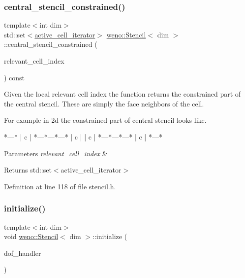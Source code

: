 \subsubsection{\texorpdfstring{central\+\_\+stencil\+\_\+constrained()}{central\_stencil\_constrained()}}
{\footnotesize\ttfamily template$<$int dim$>$ \\
std\+::set$<$\hyperlink{classweno_1_1_stencil_a5a730ad61bd5e9c36a86ccb36578f42c}{active\+\_\+cell\+\_\+iterator}$>$ \hyperlink{classweno_1_1_stencil}{weno\+::\+Stencil}$<$ dim $>$\+::central\+\_\+stencil\+\_\+constrained (\begin{DoxyParamCaption}\item[{const unsigned int \&}]{relevant\+\_\+cell\+\_\+index }\end{DoxyParamCaption}) const\hspace{0.3cm}{\ttfamily [inline]}}



Given the local relevant cell index the function returns the constrained part of the central stencil. These are simply the face neighbors of the cell. 

For example in 2d the constrained part of central stencil looks like.

\begin{DoxyVerb}     *---*
     | c |
 *---*---*---*
 | c |   | c |
 *---*---*---*
     | c |
     *---*
\end{DoxyVerb}



\begin{DoxyParams}{Parameters}
{\em relevant\+\_\+cell\+\_\+index} & \\
\hline
\end{DoxyParams}
\begin{DoxyReturn}{Returns}
std\+::set$<$active\+\_\+cell\+\_\+iterator$>$ 
\end{DoxyReturn}


Definition at line 118 of file stencil.\+h.

\mbox{\label{classweno_1_1_stencil_a765c64da48da663c23b80f397386f9f9}} 
\subsubsection{\texorpdfstring{initialize()}{initialize()}}
{\footnotesize\ttfamily template$<$int dim$>$ \\
void \hyperlink{classweno_1_1_stencil}{weno\+::\+Stencil}$<$ dim $>$\+::initialize (\begin{DoxyParamCaption}\item[{const dealii\+::\+Do\+F\+Handler$<$ dim $>$ \&}]{dof\+\_\+handler }\end{DoxyParamCaption})}



